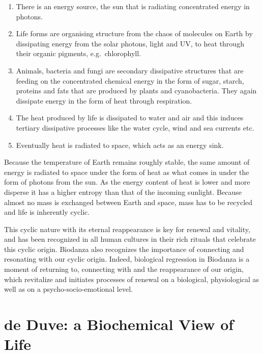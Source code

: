 \documentclass[
  11pt,
]{book}
\begin{document}
\begin{enumerate}
\def\labelenumi{\arabic{enumi}.}
\item
  There is an energy source, the sun that is radiating concentrated energy in photons.
\item
  Life forms are organising structure from the chaos of molecules on Earth by dissipating energy from the solar photons, light and UV, to heat through their organic pigments, e.g.~chlorophyll.
\item
  Animals, bacteria and fungi are secondary dissipative structures that are feeding on the concentrated chemical energy in the form of sugar, starch, proteins and fats that are produced by plants and cyanobacteria. They again dissipate energy in the form of heat through respiration.
\item
  The heat produced by life is dissipated to water and air and this induces tertiary dissipative processes like the water cycle, wind and sea currents etc.
\item
  Eventually heat is radiated to space, which acts as an energy sink.
\end{enumerate}

Because the temperature of Earth remains roughly stable, the same amount of energy is radiated to space under the form of heat as what comes in under the form of photons from the sun. As the energy content of heat is lower and more disperse it has a higher entropy than that of the incoming sunlight.
Because almost no mass is exchanged between Earth and space, mass has to be recycled and life is inherently cyclic.

This cyclic nature with its eternal reappearance is key for renewal and vitality, and has been recognized in all human cultures in their rich rituals that celebrate this cyclic origin. Biodanza also recognizes the importance of connecting and resonating with our cyclic origin. Indeed, biological regression in Biodanza is a moment of returning to, connecting with and the reappearance of our origin, which revitalize and initiates processes of renewal on a biological, physiological as well as on a psycho-socio-emotional level.

\newpage

\hypertarget{de-duve-a-biochemical-view-of-life}{%
\section{de Duve: a Biochemical View of Life}\label{de-duve-a-biochemical-view-of-life}}
\end{document}
